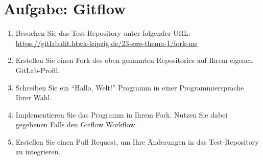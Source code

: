 
\section{Aufgabe: Gitflow}
\label{sec:task:gitflow}


\begin{enumerate}
    \item Besuchen Sie das Test\hyp Repository unter folgender URL: \url{https://gitlab.dit.htwk-leipzig.de/23-swe-thema-1/fork-me}
    
    \item Erstellen Sie einen Fork des oben genannten Repositories auf Ihrem eigenen GitLab\hyp Profil.
  
    \item Schreiben Sie ein \enquote{Hallo, Welt!} Programm in einer Programmiersprache Ihrer Wahl.
  
    \item Implementieren Sie das Programm in Ihrem Fork. Nutzen Sie dabei gegebenen Falls den Gitflow Workflow.
  
    \item Erstellen Sie einen Pull Request, um Ihre Änderungen in das Test\hyp Repository zu integrieren.
  
  \end{enumerate}
